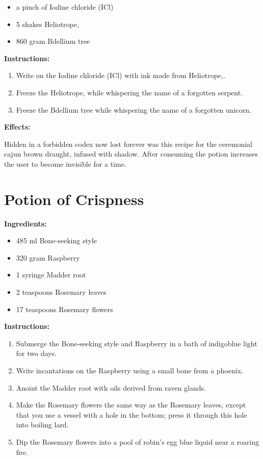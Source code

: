 \documentclass{article}
\begin{document}
\begin{itemize}
  \item a pinch of Iodine chloride (ICl)
  \item 5 shakes Heliotrope,
  \item 860 gram Bdellium tree
\end{itemize}

\textbf{Instructions:}

\begin{enumerate}
  \item Write on the Iodine chloride (ICl) with ink made from Heliotrope,.
  \item Freeze the Heliotrope, while whispering the name of a forgotten serpent.
  \item Freeze the Bdellium tree while whispering the name of a forgotten unicorn.
\end{enumerate}

\textbf{Effects:}

Hidden in a forbidden codex now lost forever was this recipe for the ceremonial cajun brown draught, infused with shadow. After consuming the potion increases the user to become invisible for a time.

\newpage
\section*{Potion of Crispness}

\textbf{Ingredients:}

\begin{itemize}
  \item 485 ml Bone-seeking style
  \item 320 gram Raspberry
  \item 1 syringe Madder root
  \item 2 teaspoons Rosemary leaves
  \item 17 teaspoons Rosemary flowers
\end{itemize}

\textbf{Instructions:}

\begin{enumerate}
  \item Submerge the Bone-seeking style and Raspberry in a bath of indigoblue light for two days.
  \item Write incantations on the Raspberry using a small bone from a phoenix.
  \item Anoint the Madder root with oils derived from raven glands.
  \item Make the Rosemary flowers the same way as the Rosemary leaves, except that you use a vessel with a hole in the bottom; press it through this hole into boiling lard.
  \item Dip the Rosemary flowers into a pool of robin's egg blue liquid near a roaring fire.
\end{enumerate}
\end{document}
